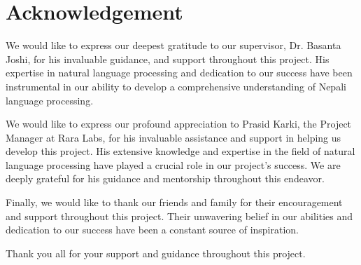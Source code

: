 \chapter*{Acknowledgement}
We would like to express our deepest gratitude to our supervisor, Dr. Basanta Joshi, for his invaluable guidance, and support throughout this project. His expertise in natural language processing and dedication to our success have been instrumental in our ability to develop a comprehensive understanding of Nepali language processing.

We would like to express our profound appreciation to Prasid Karki, the Project Manager at Rara Labs, for his invaluable assistance and support in helping us develop this project. His extensive knowledge and expertise in the field of natural language processing have played a crucial role in our project's success. We are deeply grateful for his guidance and mentorship throughout this endeavor.

Finally, we would like to thank our friends and family for their encouragement and support throughout this project. Their unwavering belief in our abilities and dedication to our success have been a constant source of inspiration.

Thank you all for your support and guidance throughout this project.